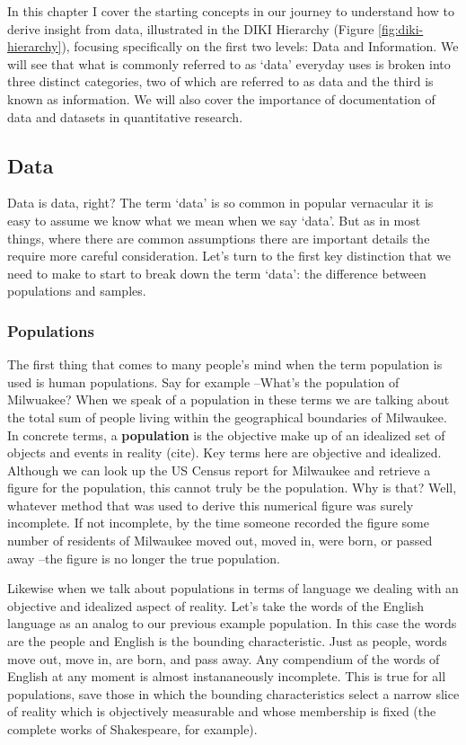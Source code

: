 \documentclass[
]{article}
\begin{document}
In this chapter I cover the starting concepts in our journey to understand how to derive insight from data, illustrated in the DIKI Hierarchy (Figure \ref{fig:diki-hierarchy}), focusing specifically on the first two levels: Data and Information. We will see that what is commonly referred to as `data' everyday uses is broken into three distinct categories, two of which are referred to as data and the third is known as information. We will also cover the importance of documentation of data and datasets in quantitative research.

\hypertarget{data}{%
\subsection{Data}\label{data}}

Data is data, right? The term `data' is so common in popular vernacular it is easy to assume we know what we mean when we say `data'. But as in most things, where there are common assumptions there are important details the require more careful consideration. Let's turn to the first key distinction that we need to make to start to break down the term `data': the difference between populations and samples.

\hypertarget{populations}{%
\subsubsection{Populations}\label{populations}}

The first thing that comes to many people's mind when the term population is used is human populations. Say for example --What's the population of Milwuakee? When we speak of a population in these terms we are talking about the total sum of people living within the geographical boundaries of Milwaukee. In concrete terms, a \textbf{population} is the objective make up of an idealized set of objects and events in reality (cite). Key terms here are objective and idealized. Although we can look up the US Census report for Milwaukee and retrieve a figure for the population, this cannot truly be the population. Why is that? Well, whatever method that was used to derive this numerical figure was surely incomplete. If not incomplete, by the time someone recorded the figure some number of residents of Milwaukee moved out, moved in, were born, or passed away --the figure is no longer the true population.

Likewise when we talk about populations in terms of language we dealing with an objective and idealized aspect of reality. Let's take the words of the English language as an analog to our previous example population. In this case the words are the people and English is the bounding characteristic. Just as people, words move out, move in, are born, and pass away. Any compendium of the words of English at any moment is almost instananeously incomplete. This is true for all populations, save those in which the bounding characteristics select a narrow slice of reality which is objectively measurable and whose membership is fixed (the complete works of Shakespeare, for example).
\end{document}
